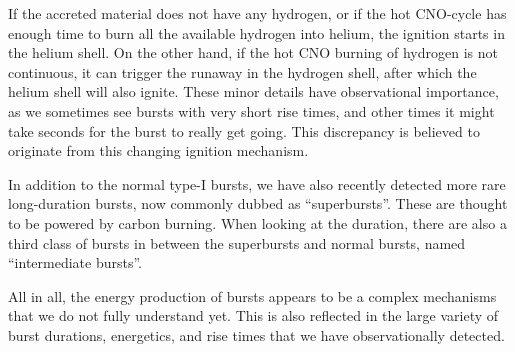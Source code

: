 If the accreted material does not have any hydrogen, or if the hot CNO-cycle has enough time to burn all the available hydrogen into helium, the ignition starts in the helium shell.
On the other hand, if the hot CNO burning of hydrogen is not continuous, it can trigger the runaway in the hydrogen shell, after which the helium shell will also ignite.
These minor details have observational importance, as we sometimes see bursts with very short rise times, and other times it might take seconds for the burst to really get going.%
This discrepancy is believed to originate from this changing ignition mechanism.

In addition to the normal type-I bursts, we have also recently detected more rare long-duration bursts, now commonly dubbed as ``superbursts''.\cite{CHK00, Kuulkers02, SB02}
These are thought to be powered by carbon burning.\cite{Cumming01}
When looking at the duration, there are also a third class of bursts in between the superbursts and normal bursts, named ``intermediate bursts''.\cite{Cumming06}

All in all, the energy production of bursts appears to be a complex mechanisms that we do not fully understand yet.
This is also reflected in the large variety of burst durations, energetics, and rise times that we have observationally detected.\cite[see e.g.,][]{GMH08}
